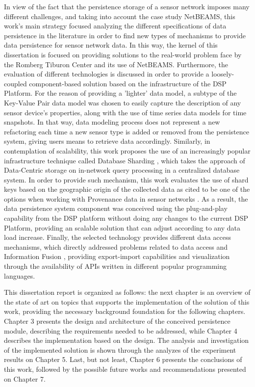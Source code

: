 In view of the fact that the persistence storage of a sensor network imposes
many different challenges, and taking into account the case study NetBEAMS, this
work's main strategy focused analyzing the different specifications of data
persistence in the literature in order to find new types of mechanisms to
provide data persistence for sensor network data. In this way, the kernel of
this dissertation is focused on providing solutions to the real-world problem
face by the Romberg Tiburon Center and its use of NetBEAMS. Furthermore,
the evaluation of different technologies is discussed in order to provide a
loosely-coupled component-based solution based on the infrastructure of the 
DSP Platform. For the reason of providing a 'lighter' data model, a subtype of
the Key-Value Pair \cite{db-kvp01} data model was chosen to easily capture the
description of any sensor device's properties, along with the use of time
series data models \cite{sn-provenance01} for time snapshots. In that way, data
modeling process does not represent a new refactoring each time a new sensor 
type is added or removed from the persistence system, giving users means to 
retrieve data accordingly. Similarly, in contemplation of scalability, this 
work proposes the use of an increasingly popular infrastructure technique called
Database Sharding \cite{db-shard01} \cite{db-shard02}, which takes the approach
of Data-Centric storage \cite{sn-storage03} on in-network query processing in a
centralized database system. In order to provide such mechanism, this work
evaluates the use of shard keys based on the geographic origin of the collected
data as cited to be one of the options when working with Provenance data in 
sensor networks \cite{sn-provenance01}. As a result, the data persistence system
component was conceived using the plug-and-play capability from the DSP 
platform without doing  any changes to the current DSP Platform, providing an
scalable solution that can adjust according to any data load increase. Finally,
the selected technology provides different data access mechanisms, which
directly addressed problems related to data access and Information Fusion 
\cite{sn-info-fusion}, providing export-import capabilities and visualization through
the availability of APIs written in different popular programming languages.

This dissertation report is organized as follows: the next chapter is an 
overview of the state of art on topics that supports the implementation of the
solution of this work, providing the necessary background foundation for the 
following chapters. Chapter 3 presents the design and architecture of the 
conceived persistence module, describing the requirements needed to be
addressed,  while Chapter 4 describes the implementation based on the design. 
The analysis and investigation of the implemented solution is shown through 
the analyzes of the experiment results on Chapter 5. Last, but not least, 
Chapter 6 presents the conclusions of this work, followed by the possible 
future works and recommendations presented on Chapter 7.